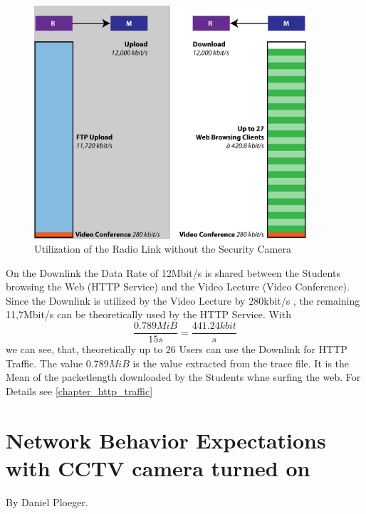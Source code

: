 \documentclass[a4paper,10pt]{book}\usepackage{graphicx}
\begin{document}
\begin{figure}[!ht]
  \centering
    \includegraphics[width=0.9\textwidth]{graphics-02.png}
    
    \caption{Utilization of the Radio Link without the Security Camera}
\end{figure}

On the Downlink the Data Rate of 12Mbit/s is shared between the Students browsing the Web (HTTP Service) and the Video Lecture (Video Conference).
Since the Downlink is utilized by the Video Lecture by 280kbit/s , the remaining 11,7Mbit/s 
can be theoretically used by the HTTP Service. With 
\begin{equation}
 \frac{0.789MiB}{15s}=\frac{441.24kbit}{s}
\end{equation}
we can see, that, theoretically up to 26 Users can use the Downlink for HTTP Traffic.
The value $0.789MiB$ is the value extracted from the trace file. It is the Mean of the packetlength downloaded by the Students whne surfing the web. For Details see \ref{chapter_http_traffic}





\section{Network Behavior  Expectations with CCTV camera turned on}
By Daniel Ploeger.
\end{document}
